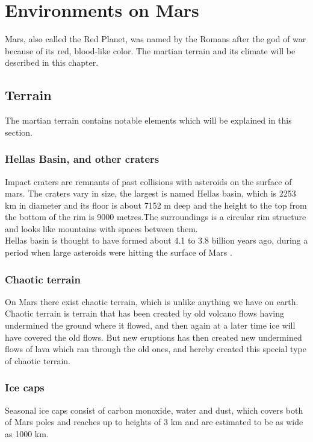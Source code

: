 \chapter{Environments on Mars}\label{ch:environmentOnMars}

Mars, also called the Red Planet, was named by the Romans after the god of war because of its red, blood-like color. The martian terrain and its climate will be described in this chapter.

\section{Terrain} 
The martian terrain contains notable elements which will be explained in this section.

\subsection{Hellas Basin, and other craters}
Impact craters are remnants of past collisions with asteroids on the surface of mars. The craters vary in size, the largest is named Hellas basin, which is 2253 km in diameter and its floor is about 7152 m  deep and the height to the top from the bottom of the rim is 9000 metres.The surroundings is a circular rim structure and looks like mountains with spaces between them.\\
Hellas basin is thought to have formed about 4.1 to 3.8 billion years ago, during a period when large asteroids were hitting the surface of Mars \cite{hellas}.

\subsection{Chaotic terrain}\label{ch:chaoticT}
On Mars there exist chaotic terrain, which is unlike anything we have on earth.\\
Chaotic terrain is terrain that has been created by old volcano flows having undermined the ground where it flowed, and then again at a later time ice will have covered the old flows. But new eruptions has then created new undermined flows of lava which ran through the old ones, and hereby created this special type of chaotic terrain\cite{CTerrain}.%

\subsection{Ice caps}
Seasonal ice caps consist of carbon monoxide, water and dust, which covers both of Mars poles and reaches up to heights of 3 km and are estimated to be as wide as 1000 km.

